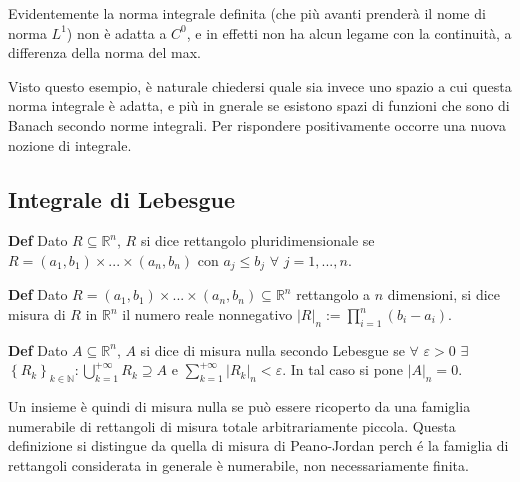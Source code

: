 \documentclass{article}
\begin{document}
Evidentemente la norma integrale definita (che pi\`{u} avanti prender\`{a}
il nome di norma $L^{1}$) non \`{e} adatta a $C^{0}$, e in effetti non ha
alcun legame con la continuit\`{a}, a differenza della norma del max.

Visto questo esempio, \`{e} naturale chiedersi quale sia invece uno spazio a
cui questa norma integrale \`{e} adatta, e pi\`{u} in gnerale se esistono
spazi di funzioni che sono di Banach secondo norme integrali. Per rispondere
positivamente occorre una nuova nozione di integrale.

\subsection{Integrale di Lebesgue}

\textbf{Def} Dato $R\subseteq 
\mathbb{R}
^{n}$, $R$ si dice rettangolo pluridimensionale se $R=\left(
a_{1},b_{1}\right) \times ...\times \left( a_{n},b_{n}\right) $ con $%
a_{j}\leq b_{j}$ $\forall $ $j=1,...,n$.

\textbf{Def} Dato $R=\left( a_{1},b_{1}\right) \times ...\times \left(
a_{n},b_{n}\right) \subseteq 
\mathbb{R}
^{n}$ rettangolo a $n$ dimensioni, si dice misura di $R$ in $%
\mathbb{R}
^{n}$ il numero reale nonnegativo $\left\vert R\right\vert
_{n}:=\prod_{i=1}^{n}\left( b_{i}-a_{i}\right) $.

\textbf{Def} Dato $A\subseteq 
\mathbb{R}
^{n}$, $A$ si dice di misura nulla secondo Lebesgue se $\forall $ $%
\varepsilon >0$ $\exists $ $\left\{ R_{k}\right\} _{k\in 
\mathbb{N}
}:\bigcup_{k=1}^{+\infty }R_{k}\supseteq A$ e $\sum_{k=1}^{+\infty
}\left\vert R_{k}\right\vert _{n}<\varepsilon $. In tal caso si pone $%
\left\vert A\right\vert _{n}=0$.

Un insieme \`{e} quindi di misura nulla se pu\`{o} essere ricoperto da una
famiglia numerabile di rettangoli di misura totale arbitrariamente piccola.
Questa definizione si distingue da quella di misura di Peano-Jordan perch%
\'{e} la famiglia di rettangoli considerata in generale \`{e} numerabile,
non necessariamente finita.
\end{document}
